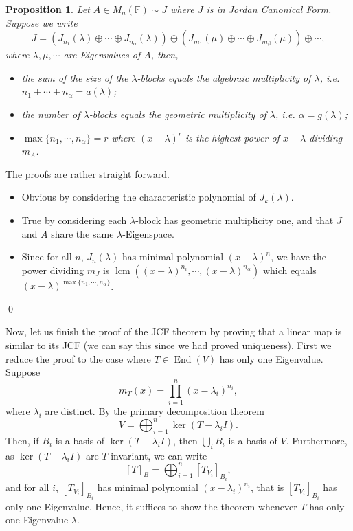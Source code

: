 \documentclass[
]{article}
\newtheorem{prop}{Proposition}[section]
\theoremstyle{definition}
\begin{document}
\begin{prop}
  Let \(A \in M_n(\mathbb{F}) \sim J\) where \(J\) is in Jordan Canonical Form. 
  Suppose we write 
  \[J = (J_{n_1}(\lambda) \oplus \cdots \oplus J_{n_\alpha}(\lambda)) \oplus 
    (J_{m_1}(\mu) \oplus \cdots \oplus J_{m_\beta}(\mu)) \oplus \cdots,\]
  where \(\lambda, \mu, \cdots\) are Eigenvalues of \(A\), then,
  \begin{itemize}
    \item the sum of the size of the \(\lambda\)-blocks equals the algebraic 
    multiplicity of \(\lambda\), i.e. \(n_1 + \cdots + n_\alpha = a(\lambda)\);
    \item the number of \(\lambda\)-blocks equals the geometric multiplicity of 
    \(\lambda\), i.e. \(\alpha = g(\lambda)\);
    \item \(\max \{n_1, \cdots, n_\alpha\} = r\) where \((x - \lambda)^r\) is the 
    highest power of \(x - \lambda\) dividing \(m_A\).
  \end{itemize}
\end{prop}
\proof

The proofs are rather straight forward.

\begin{itemize}
    \item Obvious by considering the characteristic polynomial of \(J_k(\lambda)\).
    \item True by considering each \(\lambda\)-block has geometric multiplicity one, 
      and that \(J\) and \(A\) share the same \(\lambda\)-Eigenspace.
    \item Since for all \(n\), \(J_n(\lambda)\) has minimal polynomial 
    \((x - \lambda)^n\), we have the power dividing \(m_J\) is 
    \(\mathop{\mathrm{lcm}}((x - \lambda)^{n_i}, \cdots, (x - \lambda)^{n_\alpha})\) which equals 
    \((x - \lambda)^{\max \{n_1, \cdots, n_\alpha\}}\).
  \end{itemize}
\qed

Now, let us finish the proof of the JCF theorem by proving that a linear
map is similar to its JCF (we can say this since we had proved
uniqueness). \proof First we reduce the proof to the case where
\(T \in \mathop{\mathrm{End}}(V)\) has only one Eigenvalue. Suppose
\[m_T(x) = \prod_{i = 1}^n(x - \lambda_i)^{n_i},\] where \(\lambda_i\)
are distinct. By the primary decomposition theorem
\[V = \bigoplus_{i = 1}^n \ker (T - \lambda_i I).\] Then, if \(B_i\) is
a basis of \(\ker (T - \lambda_i I)\), then \(\bigcup_i B_i\) is a basis
of \(V\). Furthermore, as \(\ker (T - \lambda_i I)\) are
\(T\)-invariant, we can write
\[[T]_B = \bigoplus_{i = 1}^n [T_{V_i}]_{B_i},\] and for all \(i\),
\([T_{V_i}]_{B_i}\) has minimal polynomial \((x - \lambda_i)^{n_i}\),
that is \([T_{V_i}]_{B_i}\) has only one Eigenvalue. Hence, it suffices
to show the theorem whenever \(T\) has only one Eigenvalue \(\lambda\).
\end{document}
